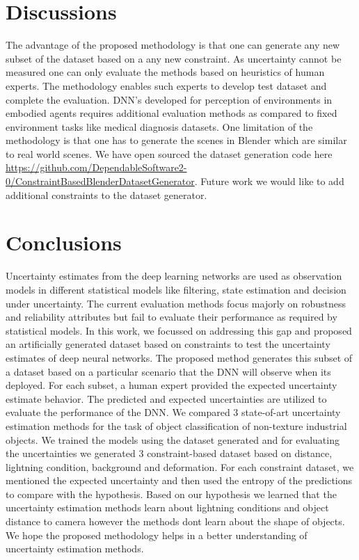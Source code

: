 





\hypertarget{discussions}{%
\section{Discussions}\label{discussions}}
The advantage of the proposed methodology is that one can generate any new subset of the dataset based on a any new constraint. As uncertainty cannot be measured one can only evaluate the methods based on heuristics of human experts. The methodology enables such experts to develop test dataset and complete the evaluation. DNN's developed for perception of environments in embodied agents requires additional evaluation methods as compared to fixed environment tasks like medical diagnosis datasets.  One limitation of the methodology is that one has to generate the scenes in Blender which are similar to real world scenes. We have open sourced the dataset generation code here \url{https://github.com/DependableSoftware2-0/ConstraintBasedBlenderDatasetGenerator}. Future work we would like to add additional constraints to the dataset generator.

\hypertarget{conclusions}{%
\section{Conclusions}\label{conclusions}}
Uncertainty estimates from the deep learning networks are used as observation models in different statistical models like filtering, state estimation and decision under uncertainty. The current evaluation methods focus majorly on robustness and reliability attributes but fail to evaluate their performance as required by statistical models. In this work, we focussed on addressing this gap and proposed an artificially generated dataset based on constraints to test the uncertainty estimates of deep neural networks.
The proposed method generates this subset of a dataset based on a particular scenario that the DNN will observe when its deployed. For each subset, a human expert  provided the expected uncertainty estimate behavior.  The predicted and expected uncertainties are utilized to evaluate the performance of the DNN.
We compared 3 state-of-art uncertainty estimation methods for the task of object classification of non-texture industrial objects. We trained the models using the dataset generated and for evaluating the uncertainties we generated 3 constraint-based dataset based on distance, lightning condition, background and deformation. 
For each constraint dataset, we mentioned the expected uncertainty and then used the entropy of the predictions to compare with the hypothesis.
Based on our hypothesis we learned that the uncertainty estimation methods learn about lightning conditions and object distance to camera however the methods dont learn about the shape of objects.
We hope the proposed methodology helps in a better understanding of uncertainty estimation methods.


